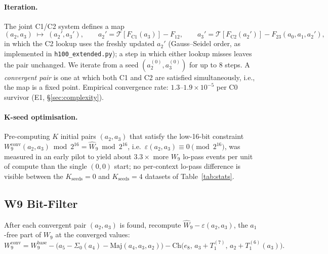 \documentclass[11pt,a4paper]{article}
\newcommand{\Sig}[1]{\Sigma_{#1}}
\newcommand{\Maj}{\mathrm{Maj}}
\newcommand{\Ch}{\mathrm{Ch}}
\begin{document}
\paragraph{Iteration.}
The joint C1/C2 system defines a map
\[
  (a_2,a_3) \;\mapsto\; (a_2',a_3'),\qquad
  a_2' = \mathcal{T}[F_{\mathrm{C1}}(a_3)] - F_{12},\qquad
  a_3' = \mathcal{T}[F_{\mathrm{C2}}(a_2')] - F_{23}(a_0,a_1,a_2'),
\]
in which the C2 lookup uses the freshly updated $a_2'$ (Gauss--Seidel order, as implemented in \texttt{h100\_extended.py}); a step in which either lookup misses leaves the pair unchanged.
We iterate from a seed $(a_2^{(0)}, a_3^{(0)})$ for up to $8$ steps.
A \emph{convergent pair} is one at which both C1 and C2 are satisfied
simultaneously, i.e., the map is a fixed point.  Empirical convergence
rate: $1.3$--$1.9\times10^{-5}$ per C0 survivor (E1, \S\ref{sec:complexity}).

\paragraph{K-seed optimisation.}
Pre-computing $K$ initial pairs $(a_2,a_3)$ that satisfy the low-16-bit constraint $W_9^{\mathrm{conv}}(a_2,a_3) \bmod 2^{16} = \hat{W}_9 \bmod 2^{16}$, i.e.\ $\varepsilon(a_2,a_3) \equiv 0 \pmod{2^{16}}$, was measured in an early pilot to yield about $3.3\times$ more $W_9$ lo-pass events per unit of compute than the single $(0,0)$ start; no per-context lo-pass difference is visible between the $K_{\mathrm{seeds}}{=}0$ and $K_{\mathrm{seeds}}{=}4$ datasets of Table~\ref{tab:stats}.

\subsection{W9 Bit-Filter}
\label{sec:w9filter}

After each convergent pair $(a_2, a_3)$ is found, recompute
$\hat W_9 - \varepsilon(a_2,a_3)$, the $a_1$-free part of $W_9$ at the
converged values:
\begin{equation}
  W_9^{\mathrm{conv}} = W_9^{\mathrm{base}}
    - \bigl(a_5 - \Sig{0}(a_4) - \Maj(a_4,a_3,a_2)\bigr)
    - \Ch\!\bigl(e_8,\, a_3+T_1^{(7)},\, a_2+T_1^{(6)}(a_3)\bigr).
  \label{eq:W9true}
\end{equation}
\end{document}
